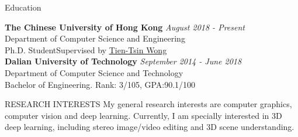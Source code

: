 \documentclass{resume} %
\begin{document}

\begin{rSection}{Education}

{\bf The Chinese University of Hong Kong} \hfill {\em August 2018 - Present} 
\\ Department of Computer Science and Engineering
\\ Ph.D. Student\hfill{Supervised by \href{https://appsrv.cse.cuhk.edu.hk/~ttwong/myself.html}{Tien-Tsin Wong}}
\\

{\bf Dalian University of Technology} \hfill {\em September 2014 - June 2018}
\\ Department of Computer Science and Technology
\\ Bachelor of Engineering.\hfill { Rank: 3/105, GPA:90.1/100 }

\end{rSection}

\begin{rSection}{RESEARCH INTERESTS}
My general research interests are computer graphics, computer vision and deep learning. Currently, I am specially interested in 3D deep learning, including stereo image/video editing and 3D scene understanding. 
\end{rSection}

\end{document}
